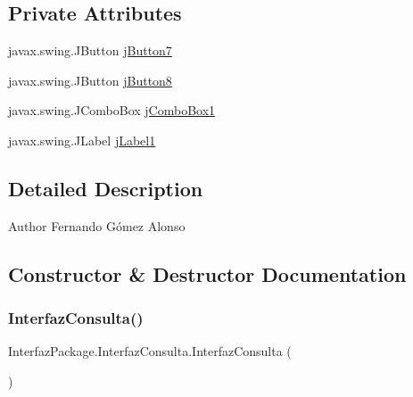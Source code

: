 \subsection*{Private Attributes}
\begin{DoxyCompactItemize}
\item 
javax.\+swing.\+J\+Button \mbox{\hyperlink{class_interfaz_package_1_1_interfaz_consulta_afd5c627098a6c6bb116f8120486ba5bd}{j\+Button7}}
\item 
javax.\+swing.\+J\+Button \mbox{\hyperlink{class_interfaz_package_1_1_interfaz_consulta_a82083645edf763690351c2f33263a8a1}{j\+Button8}}
\item 
javax.\+swing.\+J\+Combo\+Box \mbox{\hyperlink{class_interfaz_package_1_1_interfaz_consulta_adc5bff154b6dcb8682ea4727b7783ee5}{j\+Combo\+Box1}}
\item 
javax.\+swing.\+J\+Label \mbox{\hyperlink{class_interfaz_package_1_1_interfaz_consulta_aeeb159dc49a945f8285bc200316b7b38}{j\+Label1}}
\end{DoxyCompactItemize}


\subsection{Detailed Description}
\begin{DoxyAuthor}{Author}
Fernando Gómez Alonso 
\end{DoxyAuthor}


\subsection{Constructor \& Destructor Documentation}
\mbox{\label{class_interfaz_package_1_1_interfaz_consulta_a58097671d4b2680db3ec600ad744ebd9}} 
\subsubsection{\texorpdfstring{Interfaz\+Consulta()}{InterfazConsulta()}}
{\footnotesize\ttfamily Interfaz\+Package.\+Interfaz\+Consulta.\+Interfaz\+Consulta (\begin{DoxyParamCaption}{ }\end{DoxyParamCaption})\hspace{0.3cm}{\ttfamily [inline]}}


